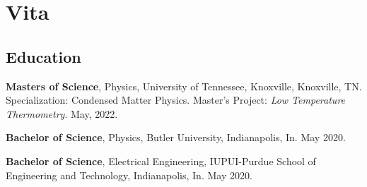 \chapter*{Vita} \label{ch:vita}
\section*{Education}

\textbf{Masters of Science}, Physics, University of Tennessee, Knoxville, Knoxville, TN. Specialization:  Condensed Matter Physics. Master's Project: \emph{Low Temperature Thermometry}. May, 2022.

\noindent\textbf{Bachelor of Science}, Physics, Butler University, Indianapolis, In. May 2020.

\noindent\textbf{Bachelor of Science}, Electrical Engineering, IUPUI-Purdue School of Engineering and Technology, Indianapolis, In. May 2020. 